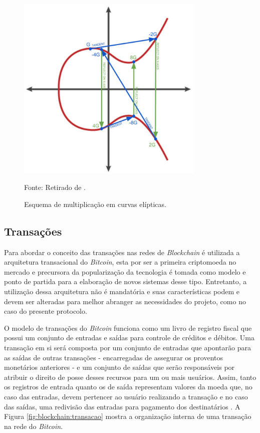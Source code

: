 \begin{figure}[ht]
\caption{Esquema de multiplicação em curvas elípticas.}
\centering
\includegraphics[width=0.8\textwidth]{imagens/ecc.png}
\begin{center}
        Fonte: Retirado de \cite{blockchain:mastering_bitcoin}.
\end{center}
\label{fig:mult_ecc}
\end{figure}

\subsection{Transações}
\label{subsec:blobkchain:transacaoes}

Para abordar o conceito das transações nas redes de \textit{Blockchain} é utilizada a arquitetura transacional do \textit{Bitcoin}, esta por ser a primeira criptomoeda no mercado e precursora da popularização da tecnologia é tomada como modelo e ponto de partida para a elaboração de novos sistemas desse tipo. Entretanto, a utilização dessa arquitetura não é mandatória e suas características podem e devem ser alteradas para melhor abranger as necessidades do projeto, como no caso do presente protocolo.

%
O modelo de transações do \textit{Bitcoin} funciona como um livro de registro fiscal que possui um conjunto de entradas e saídas para controle de créditos e débitos. Uma transação em si será composta por um conjunto de entradas que apontarão para as saídas de outras transações - encarregadas de assegurar os proventos monetários anteriores - e um conjunto de saídas que serão responsáveis por atribuir o direito de posse desses recursos para um ou mais usuários. Assim, tanto os registros de entrada quanto os de saída representam valores da moeda que, no caso das entradas, devem pertencer ao usuário realizando a transação e no caso das saídas, uma redivisão das entradas para pagamento dos destinatários \cite{blockchain:documentacao_bitcoin}. A Figura \ref{fig:blockchain:transacao} mostra a organização interna de uma transação na rede do \textit{Bitcoin}.


